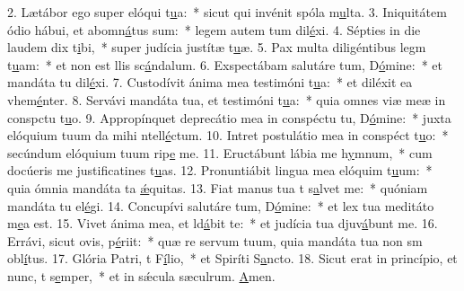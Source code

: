 2. Lætábor ego super elóqui t\uline{u}a:~* sicut qui invénit spóla m\uline{u}lta.
3. Iniquitátem ódio hábui, et abomn\uline{á}tus sum:~* legem autem tum dil\uline{é}xi.
4. Sépties in die laudem dix t\uline{i}bi,~* super judícia justítæ t\uline{u}æ.
5. Pax multa diligéntibus legm t\uline{u}am:~* et non est llis sc\uline{á}ndalum.
6. Exspectábam salutáre tum, D\uline{ó}mine:~* et mandáta tu dil\uline{é}xi.
7. Custodívit ánima mea testimóni t\uline{u}a:~* et diléxit ea vhem\uline{é}nter.
8. Servávi mandáta tua, et testimóni t\uline{u}a:~* quia omnes viæ meæ in conspctu t\uline{u}o.
9. Appropínquet deprecátio mea in conspéctu tu, D\uline{ó}mine:~* juxta elóquium tuum da mihi ntell\uline{é}ctum.
10. Intret postulátio mea in conspéct t\uline{u}o:~* secúndum elóquium tuum rip\uline{e} me.
11. Eructábunt lábia me h\uline{y}mnum,~* cum docúeris me justificatines t\uline{u}as.
12. Pronuntiábit lingua mea elóquim t\uline{u}um:~* quia ómnia mandáta ta \uline{ǽ}quitas.
13. Fiat manus tua t s\uline{a}lvet me:~* quóniam mandáta tu el\uline{é}gi.
14. Concupívi salutáre tum, D\uline{ó}mine:~* et lex tua meditáto m\uline{e}a est.
15. Vivet ánima mea, et ld\uline{á}bit te:~* et judícia tua djuv\uline{á}bunt me.
16. Errávi, sicut ovis,  p\uline{é}riit:~* quæ re servum tuum, quia mandáta tua non sm obl\uline{í}tus.
17. Glória Patri, t F\uline{í}lio,~* et Spiríti S\uline{a}ncto.
18. Sicut erat in princípio, et nunc, t s\uline{e}mper,~* et in sǽcula sæculrum. \uline{A}men.
